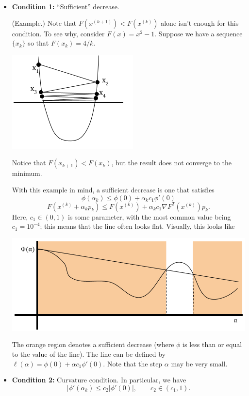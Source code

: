 \documentclass[letterpaper]{article}
\begin{document}
\begin{itemize}
    \item \textbf{Condition 1:} ``Sufficient'' decrease. 
    
    \begin{mdframed}
        (Example.) Note that $F(x^{(k + 1)}) < F(x^{(k)})$ alone isn't enough for this condition. To see why, consider $F(x) = x^2 - 1$. Suppose we have a sequence $\{x_k\}$ so that $F(x_{k}) = 4/k$. 
        \begin{center}
            \includegraphics[scale=0.7]{../assets/cond_dec.png}
        \end{center}
        Notice that $F(x_{k + 1}) < F(x_{k})$, but the result does not converge to the minimum.
    \end{mdframed}
    With this example in mind, a sufficient decrease is one that satisfies 
    \[\phi(\alpha_k) \leq \phi(0) + \alpha_k c_1 \phi'(0)\]
    \[F(x^{(k)} + \alpha_k p_k) \leq F(x^{(k)}) + \alpha_k c_1 \nabla F^{T}(x^{(k)}) p_k.\]
    Here, $c_1 \in (0, 1)$ is some parameter, with the most common value being $c_1 = 10^{-4}$; this means that the line often looks flat. Visually, this looks like 
    \begin{center}
        \includegraphics[scale=0.7]{../assets/line_search_dec.png}
    \end{center} 
    The orange region denotes a sufficient decrease (where $\phi$ is less than or equal to the value of the line). The line can be defined by $\ell(\alpha) = \phi(0) + \alpha c_1 \phi'(0)$. Note that the step $\alpha$ may be very small.
    
    \item \textbf{Condition 2:} Curvature condition. In particular, we have 
    \[|\phi'(\alpha_k) \leq c_2 |\phi'(0)|, \qquad c_2 \in (c_1, 1).\]
\end{itemize}
\end{document}
